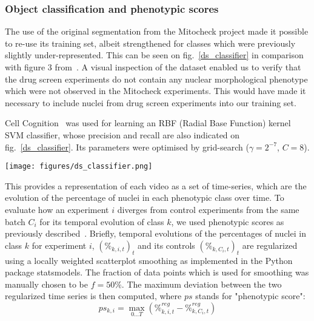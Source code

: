 \subsubsection{Object classification and phenotypic scores}
\label{sec:ps}
The use of the original segmentation from the Mitocheck project made it possible to re-use its training set, albeit strengthened for classes which were previously slightly under-represented. This can be seen on fig.~\ref{ds_classifier} in comparison with figure 3 from~\cite{Walter2010}. A visual inspection of the dataset enabled us to verify that the drug screen experiments do not contain any nuclear morphological phenotype which were not observed in the Mitocheck experiments. This would have made it necessary to include nuclei from drug screen experiments into our training set.

Cell Cognition~\cite{cellcognition} was used for learning an RBF (Radial Base Function) kernel SVM classifier, whose precision and recall are also indicated on fig.~\ref{ds_classifier}. Its parameters were optimised by grid-search ($\gamma=2^{-7}$, $C=8$).

\begin{figure*}[ht!]
\centerline{\texttt{[image: figures/ds\_classifier.png]}}
\caption{Precision and recall per class as provided by Cell Cognition. Compared with the original classifier as published in~\cite{Walter2010}, classes \textit{ADCCM} (Asymmetric Distribution of Condensed Chromosome Masses) and \textit{Out of focus} were added. More nuclei were furthermore included for training in most classes. \textit{Shape1} (resp. \textit{Shape3}, \textit{MetaphaseAlignement}) corresponds to binucleated (resp. polylobed, metaphase alignement problem) nuclei.}
\label{ds_classifier}
\end{figure*}

This provides a representation of each video as a set of time-series, which are the evolution of the percentage of nuclei in each phenotypic class over time. To evaluate how an experiment $i$ diverges from  control experiments from the same batch $C_i$ for its temporal evolution of class $k$, we used phenotypic scores as previously described~\cite{Walter2010}. Briefly, temporal evolutions of the percentages of nuclei in class $k$ for experiment $i$, $(\%_{k,i,t})_t$ and its controls $(\%_{k,C_i,t})_t$ are regularized using a locally weighted scatterplot smoothing as implemented in the Python package statsmodels. The fraction of data points which is used for smoothing was manually chosen to be $f=50\%$. The maximum deviation between the two regularized time series is then computed, where $ps$ stands for "phenotypic score":
\[
ps_{k,i} = \max_{0\ldots T} (\%^{reg}_{k,i,t} - \%^{reg}_{k,C_i,t})
\]

